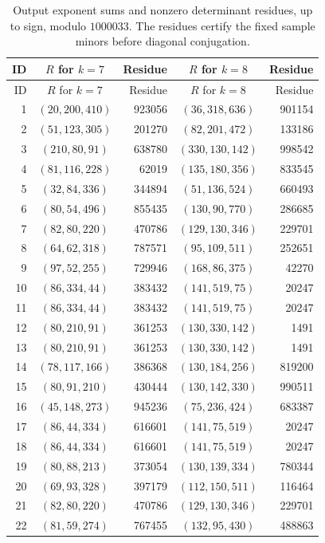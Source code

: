 \documentclass[11pt]{amsart}
\theoremstyle{definition}
\theoremstyle{remark}
\numberwithin{equation}{section}
\begin{document}
{\small
\begin{longtable}{r c r c r}
\caption{Output exponent sums and nonzero determinant residues, up to sign, modulo $1000033$. The residues certify the fixed sample minors before diagonal conjugation.}\label{low:78:h3r:residues}\\
ID & $R$ for $k=7$ & Residue & $R$ for $k=8$ & Residue\\\hline
\endfirsthead
ID & $R$ for $k=7$ & Residue & $R$ for $k=8$ & Residue\\\hline
\endhead
1 & $(20,200,410)$ & 923056 & $(36,318,636)$ & 901154\\
2 & $(51,123,305)$ & 201270 & $(82,201,472)$ & 133186\\
3 & $(210,80,91)$ & 638780 & $(330,130,142)$ & 998542\\
4 & $(81,116,228)$ & 62019 & $(135,180,356)$ & 833545\\
5 & $(32,84,336)$ & 344894 & $(51,136,524)$ & 660493\\
6 & $(80,54,496)$ & 855435 & $(130,90,770)$ & 286685\\
7 & $(82,80,220)$ & 470786 & $(129,130,346)$ & 229701\\
8 & $(64,62,318)$ & 787571 & $(95,109,511)$ & 252651\\
9 & $(97,52,255)$ & 729946 & $(168,86,375)$ & 42270\\
10 & $(86,334,44)$ & 383432 & $(141,519,75)$ & 20247\\
11 & $(86,334,44)$ & 383432 & $(141,519,75)$ & 20247\\
12 & $(80,210,91)$ & 361253 & $(130,330,142)$ & 1491\\
13 & $(80,210,91)$ & 361253 & $(130,330,142)$ & 1491\\
14 & $(78,117,166)$ & 386368 & $(130,184,256)$ & 819200\\
15 & $(80,91,210)$ & 430444 & $(130,142,330)$ & 990511\\
16 & $(45,148,273)$ & 945236 & $(75,236,424)$ & 683387\\
17 & $(86,44,334)$ & 616601 & $(141,75,519)$ & 20247\\
18 & $(86,44,334)$ & 616601 & $(141,75,519)$ & 20247\\
19 & $(80,88,213)$ & 373054 & $(130,139,334)$ & 780344\\
20 & $(69,93,328)$ & 397179 & $(112,150,511)$ & 116464\\
21 & $(82,80,220)$ & 470786 & $(129,130,346)$ & 229701\\
22 & $(81,59,274)$ & 767455 & $(132,95,430)$ & 488863\\
\end{longtable}
}
\end{document}

